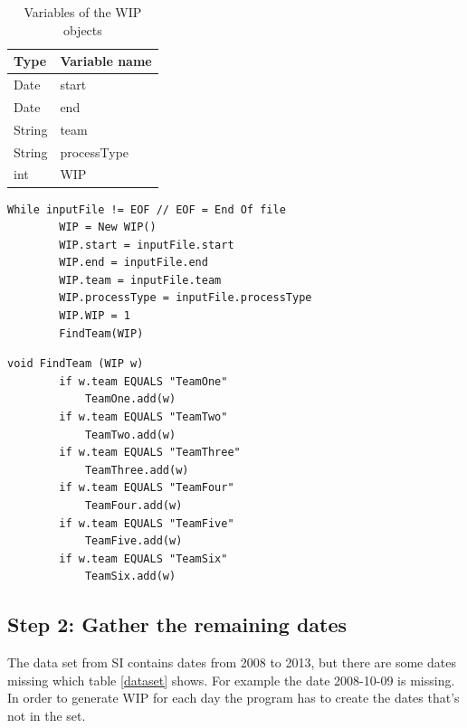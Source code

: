 \documentclass[UKenglish]{ifimaster}  %
\begin{document}
\begin{table}[!ht]
\begin{center}
\begin{tabular}{| l | l |}
\hline
Type & Variable name \\ \hline
Date & start \\ \hline
Date & end\\ \hline
String & team\\ \hline
String & processType\\ \hline
int  & WIP\\ \hline
\end{tabular}
\caption{Variables of the WIP objects}
\label{tab:object}
\end{center}
\end{table}


\begin{minipage}{\textwidth} 
 \begin{lstlisting}[caption={Gather all unique dates into Arraylist},label={lst:Arraylist}]
While inputFile != EOF // EOF = End Of file
		WIP = New WIP()
		WIP.start = inputFile.start
		WIP.end = inputFile.end
		WIP.team = inputFile.team
		WIP.processType = inputFile.processType
		WIP.WIP = 1
		FindTeam(WIP)
 \end{lstlisting}
 \end{minipage}
 
 \begin{minipage}{\textwidth} 
 \begin{lstlisting}[caption={Gather WIP object to the right data structure},label={lst:addWIP}]
void FindTeam (WIP w) 
		if w.team EQUALS "TeamOne"
			TeamOne.add(w)
		if w.team EQUALS "TeamTwo"
			TeamTwo.add(w)
		if w.team EQUALS "TeamThree"
			TeamThree.add(w)
		if w.team EQUALS "TeamFour"
			TeamFour.add(w)
		if w.team EQUALS "TeamFive"
			TeamFive.add(w)
		if w.team EQUALS "TeamSix"
			TeamSix.add(w)
 \end{lstlisting}
 \end{minipage}
 
\subsection{Step 2: Gather the remaining dates}
 \label{sub:stepTwo}
The data set from SI contains dates from 2008 to 2013, but there are some dates missing which table \ref{dataset} shows. For example the date 2008-10-09 is missing. In order to generate WIP for each day the program has to create the dates that's not in the set. 
  
\end{document}
